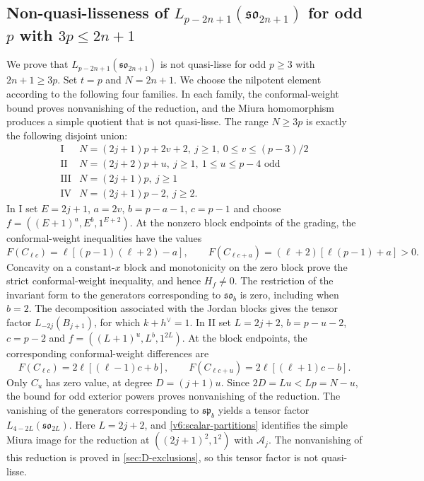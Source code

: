 \documentclass[11pt,a4paper]{amsart}
\numberwithin{equation}{section}
\theoremstyle{definition}
\theoremstyle{remark}
\newcommand{\spg}{\mathfrak{sp}}
\newcommand{\sog}{\mathfrak{so}}
\begin{document}
\subsection{\texorpdfstring{Non-quasi-lisseness of $L_{p-2n+1}(\sog_{2n+1})$ for odd $p$ with $3p\le2n+1$}{Non-quasi-lisseness of L(p-2n+1)(so(2n+1)) for odd p with 3p at most 2n+1}}\label{B:odd-exclusions}
We prove that $L_{p-2n+1}(\sog_{2n+1})$ is not quasi-lisse for odd
$p\ge3$ with $2n+1\ge3p$. Set $t=p$ and $N=2n+1$. We choose the nilpotent element
according to the following four families. In each family, the
conformal-weight bound proves nonvanishing of the reduction, and the
Miura homomorphism produces a simple quotient that is not quasi-lisse.
The range $N\ge3p$ is exactly the following disjoint union:
$$
\begin{array}{c|l}
\mathrm I&N=(2j+1)p+2v+2,\ j\ge1,\ 0\le v\le(p-3)/2\\
\mathrm {II}&N=(2j+2)p+u,\ j\ge1,\ 1\le u\le p-4\text{ odd}\\
\mathrm {III}&N=(2j+1)p,\ j\ge1\\
\mathrm {IV}&N=(2j+1)p-2,\ j\ge2.
\end{array}
$$
In I set $E=2j+1$, $a=2v$, $b=p-a-1$, $c=p-1$ and choose
$f=((E+1)^a,E^b,1^{E+2})$. At the nonzero block endpoints of the grading,
the conformal-weight inequalities have the values
$$
 F(C_{\ell c})=\ell[(p-1)(\ell+2)-a],\qquad
 F(C_{\ell c+a})=(\ell+2)[\ell(p-1)+a]>0.
$$
Concavity on a constant-$x$ block and monotonicity on the zero block
prove the strict conformal-weight inequality, and hence $H_f\ne0$. The restriction of the invariant form to the generators corresponding
to $\sog_b$ is zero, including when $b=2$. The decomposition associated
with the Jordan blocks gives the tensor factor $L_{-2j}(B_{j+1})$,
for which $k+h^\vee=1$.
In II set $L=2j+2$, $b=p-u-2$, $c=p-2$ and
$f=((L+1)^u,L^b,1^{2L})$. At the block endpoints, the corresponding
conformal-weight differences are
$$
 F(C_{\ell c})=2\ell[(\ell-1)c+b],\qquad
 F(C_{\ell c+u})=2\ell[(\ell+1)c-b].
$$
Only $C_u$ has zero value, at degree $D=(j+1)u$.
Since $2D=Lu<Lp=N-u$, the bound for odd exterior powers proves nonvanishing of the reduction.
The vanishing of the generators corresponding to $\spg_b$ yields
a tensor factor $L_{4-2L}(\sog_{2L})$.
Here $L=2j+2$, and \cref{v6:scalar-partitions} identifies the simple
Miura image for the reduction at $((2j+1)^2,1^2)$ with
$\mathcal A_j$. The nonvanishing of this reduction is proved in
\cref{sec:D-exclusions}, so this tensor factor is not quasi-lisse.
\end{document}
